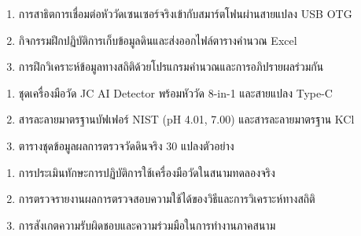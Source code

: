 \begin{tcolorbox}[
    enhanced, breakable,
    colback=white, colframe=rbruNavy,
    fonttitle=\bfseries\color{white},
    title={3. วิธีสอนและกิจกรรมการเรียนการสอน},
    arc=1.5mm, boxrule=0.8pt, leftrule=3.5mm
]
\begin{enumerate}
    \item การสาธิตการเชื่อมต่อหัววัดเซนเซอร์จริงเข้ากับสมาร์ตโฟนผ่านสายแปลง USB OTG
    \item กิจกรรมฝึกปฏิบัติการเก็บข้อมูลดินและส่งออกไฟล์ตารางคำนวณ Excel
    \item การฝึกวิเคราะห์ข้อมูลทางสถิติด้วยโปรแกรมคำนวณและการอภิปรายผลร่วมกัน
\end{enumerate}
\end{tcolorbox}

\begin{tcolorbox}[
    enhanced, breakable,
    colback=white, colframe=rbruNavy,
    fonttitle=\bfseries\color{white},
    title={4. สื่อการเรียนการสอน},
    arc=1.5mm, boxrule=0.8pt, leftrule=3.5mm
]
\begin{enumerate}
    \item ชุดเครื่องมือวัด JC AI Detector พร้อมหัววัด 8-in-1 และสายแปลง Type-C
    \item สารละลายมาตรฐานบัฟเฟอร์ NIST (pH 4.01, 7.00) และสารละลายมาตรฐาน KCl
    \item ตารางชุดข้อมูลผลการตรวจวัดดินจริง 30 แปลงตัวอย่าง
\end{enumerate}
\end{tcolorbox}

\begin{tcolorbox}[
    enhanced, breakable,
    colback=white, colframe=rbruNavy,
    fonttitle=\bfseries\color{white},
    title={5. การวัดและประเมินผล},
    arc=1.5mm, boxrule=0.8pt, leftrule=3.5mm
]
\begin{enumerate}
    \item การประเมินทักษะการปฏิบัติการใช้เครื่องมือวัดในสนามทดลองจริง
    \item การตรวจรายงานผลการตรวจสอบความใช้ได้ของวิธีและการวิเคราะห์ทางสถิติ
    \item การสังเกตความรับผิดชอบและความร่วมมือในการทำงานภาคสนาม
\end{enumerate}
\end{tcolorbox}

\clearpage


